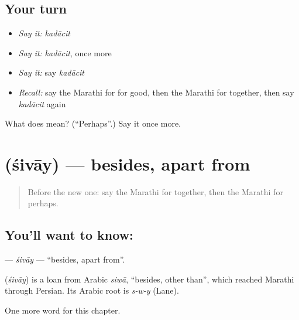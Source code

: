 \subsection*{Your turn}
\begin{itemize}
\raggedright
  \item \emph{Say it:} \emph{kadācit}
  \item \emph{Say it:} \emph{kadācit}, once more
  \item \emph{Say it:} say \emph{kadācit}
  \item \emph{Recall:} say the Marathi for for good, then the Marathi for together, then say \emph{kadācit} again
\end{itemize}

\begin{tcolorbox}[breakable,colback=teal!4,colframe=teal!35!black,title={Before you move on}]
What does  mean? (\textquotedblleft{}Perhaps\textquotedblright{}.) Say it once more.
\end{tcolorbox}
\section[\texorpdfstring{\mr{शिवाय} (śivāy)}{शिवाय (śivāy)}]{ (śivāy) — besides, apart from}

\label{lesson:MR-C231-sivay}



\begin{quote}
Before the new one: say the Marathi for together, then the Marathi for perhaps.
\end{quote}

\subsection*{You'll want to know: }
\textbf{} — \emph{śivāy} — \textquotedblleft{}besides, apart from\textquotedblright{}.

\begin{cousinweb}
\textbf{} (\emph{śivāy}) is a loan from Arabic \emph{siwā}, \textquotedblleft{}besides, other than\textquotedblright{}, which reached Marathi through Persian. Its Arabic root is \emph{s-w-y} (Lane).
\end{cousinweb}

\begin{grammarlens}[title={What you've built}]
One more word for this chapter.
\end{grammarlens}

